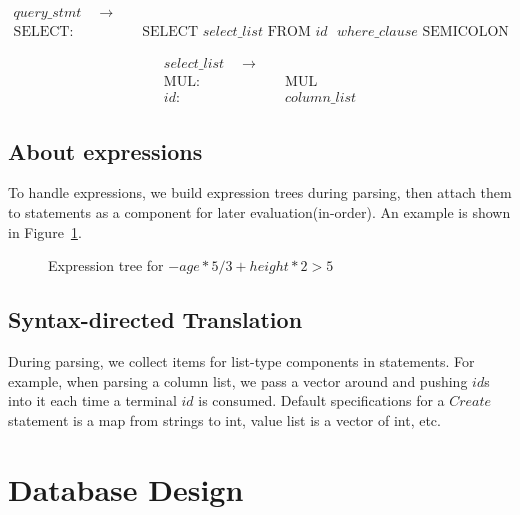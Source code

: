 \documentclass{article}
\begin{document}
\begin{align*}
query\_stmt \quad  \to & \quad\\
\text{SELECT}: & \quad \text{SELECT } select\_list \text{ FROM } id \text{ } where\_clause \text{ SEMICOLON}
\end{align*}

\begin{align*}
select\_list \quad  \to & \quad\\
\text{MUL}: & \quad \text{MUL} \\
id: & \quad column\_list
\end{align*}

\subsection{About expressions}

To handle expressions, we build expression trees during parsing, then attach them to statements as a component for later evaluation(in-order). An example is shown in Figure~\ref{fig:tree}.

\begin{figure}[H]
\centering
{}
\caption{Expression tree for $-age * 5 / 3 + height * 2 > 5$}
\label{fig:tree}
\end{figure}

\subsection{Syntax-directed Translation}
During parsing, we collect items for list-type components in statements. For example, when parsing a column list, we pass a vector around and pushing $id$s into it each time a terminal $id$ is consumed. Default specifications for a $Create$ statement is a map from strings to int, value list is a vector of int, etc.


\section{Database Design}
\end{document}
